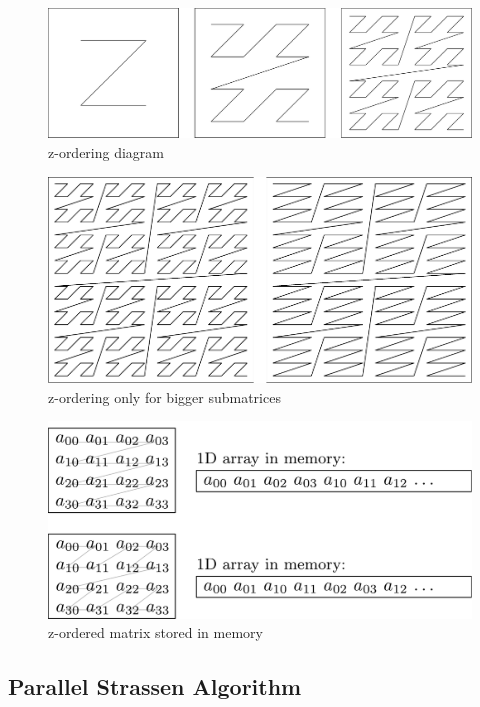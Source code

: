 \documentclass{article}
\begin{document}
\begin{figure}[htbp]
\centerline{\includegraphics[scale=.3]{z_ordering.pdf}}
\caption{z-ordering diagram}
\label{fig}
\end{figure}

\begin{figure}[htbp]
\centerline{\includegraphics[scale=.4]{partly_z_ordering.pdf}}
\caption{z-ordering only for bigger submatrices}
\label{fig}
\end{figure}

\begin{figure}[htbp]
\centerline{\includegraphics[scale=.3]{mem_ordering.pdf}}
\caption{z-ordered matrix stored in memory}
\label{fig}
\end{figure}

\subsection{Parallel Strassen Algorithm}
\end{document}
